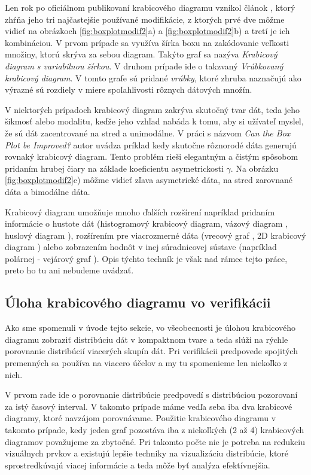 Len rok po oficiálnom publikovaní krabicového diagramu vznikol článok \cite{McGill}, ktorý zhŕňa jeho tri najčastejšie používané modifikácie, z ktorých prvé dve môžme vidieť na obrázkoch \ref{fig:boxplotmodif2}a) a \ref{fig:boxplotmodif2}b) a tretí je ich kombináciou. V prvom prípade sa využíva šírka boxu na zakódovanie veľkosti množiny, ktorú skrýva za sebou diagram. Takýto graf sa nazýva \textit{Krabicový diagram s variabilnou šírkou}.  
V druhom prípade ide o takzvaný \textit{Vrúbkovaný krabicový diagram}. V tomto grafe sú pridané \textit{vrúbky}, ktoré zhruba naznačujú ako výrazné sú rozdiely v miere spoľahlivosti rôznych dátových množín. 

V niektorých prípadoch krabicový diagram zakrýva skutočný tvar dát, teda jeho šikmosť alebo modalitu, keďže jeho vzhľad nabáda k tomu, aby si užívateľ myslel, že sú dát zacentrované na stred a unimodálne. V práci s názvom \textit{Can the Box Plot be Improved?} \cite{Chamnein} autor uvádza príklad kedy skutočne rôznorodé dáta generujú rovnaký krabicový diagram. Tento problém rieši elegantným a čistým spôsobom pridaním hrubej čiary na základe koeficientu asymetrickosti $ \gamma $. Na obrázku \ref{fig:boxplotmodif2}c) môžme vidieť zľava asymetrické dáta, na stred zarovnané dáta a bimodálne dáta.

Krabicový diagram umožňuje mnoho ďalších rozšírení napríklad pridaním informácie o hustote dát (histogramový krabicový diagram, vázový diagram \cite{HistVasePlot} , huslový diagram \cite{ViolinPlot}), rozšírením pre viacrozmerné dáta (vrecový graf \cite{Bagplot}, 2D krabicový diagram \cite{Boxplot2D} ) alebo zobrazením hodnôt v inej súradnicovej sústave (napríklad polárnej - vejárový graf \cite{FanChart}). Opis týchto techník je však nad rámec tejto práce, preto ho tu ani nebudeme uvádzať.

\subsection{Úloha krabicového diagramu vo verifikácii}

Ako sme spomenuli v úvode tejto sekcie, vo všeobecnosti je úlohou krabicového diagramu zobraziť distribúciu dát v kompaktnom tvare a teda slúži na rýchle porovnanie distribúcií viacerých skupín dát.
Pri verifikácii predpovede spojitých premenných sa používa na viacero účelov a my tu spomenieme len niekoľko z nich. 

V prvom rade ide o porovnanie distribúcie predpovedí s distribúciou pozorovaní za istý časový interval. V takomto prípade máme vedľa seba iba dva krabicové diagramy, ktoré navzájom porovnávame. Použitie krabicového diagramu v takomto prípade, kedy jeden graf pozostáva iba z niekoľkých (2 až 4) krabicových diagramov považujeme za zbytočné. Pri takomto počte nie je potreba na redukciu vizuálnych prvkov a existujú lepšie techniky na vizualizáciu distribúcie, ktoré sprostredkúvajú viacej informácie a teda môže byť analýza efektívnejšia. 

